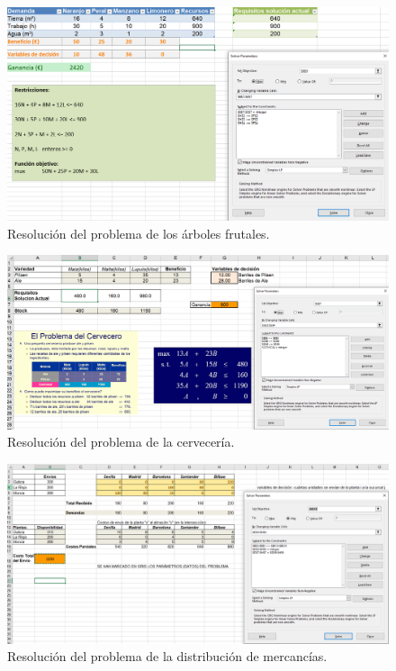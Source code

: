 \documentclass[13pt,a4paper]{article}
\begin{document}
\begin{figure}[t]\center\includegraphics[width=.95\linewidth]{img/solver.png}\caption{Resolución del problema de los árboles frutales.}\end{figure}

\begin{figure}[b]\center\includegraphics[width=.95\linewidth]{img/solver2.png}\caption{Resolución del problema de la cervecería.}\end{figure}

\begin{figure}[t]\center\includegraphics[width=.95\linewidth]{img/solver3.png}\caption{Resolución del problema de la distribución de mercancías.}\end{figure}
\end{document}
